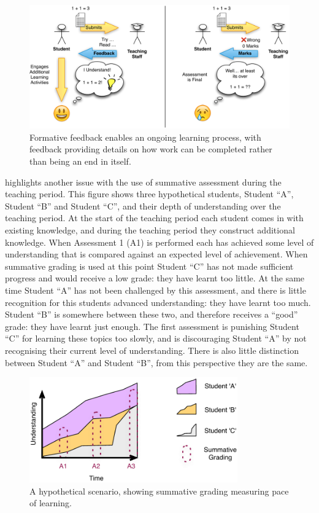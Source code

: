 \begin{figure}[htbp]
	\centering
	\includegraphics[width=\textwidth]{FormativeLearning}
	\caption{Formative feedback enables an ongoing learning process, with feedback providing details on how work can be completed rather than being an end in itself.}
	\label{fig:formative_learning}
\end{figure}



 highlights another issue with the use of summative assessment during the teaching period. This figure shows three hypothetical students, Student ``A'', Student ``B'' and Student ``C'', and their depth of understanding over the teaching period. At the start of the teaching period each student comes in with existing knowledge, and during the teaching period they construct additional knowledge. When Assessment 1 (A1) is performed each has achieved some level of understanding that is compared against an expected level of achievement. When summative grading is used at this point Student ``C'' has not made sufficient progress and would receive a low grade: they have learnt too little. At the same time Student ``A'' has not been challenged by this assessment, and there is little recognition for this students advanced understanding: they have learnt too much. Student ``B'' is somewhere between these two, and therefore receives a ``good'' grade: they have learnt just enough. The first assessment is punishing Student ``C'' for learning these topics too slowly, and is discouraging Student ``A'' by not recognising their current level of understanding. There is also little distinction between Student ``A'' and Student ``B'', from this perspective they are the same.

\begin{figure}[htbp]
	\centering
	\includegraphics[width=0.8\textwidth]{PaceOfLearning}
	\caption{A hypothetical scenario, showing summative grading measuring pace of learning.}
	\label{fig:pace}
\end{figure}

